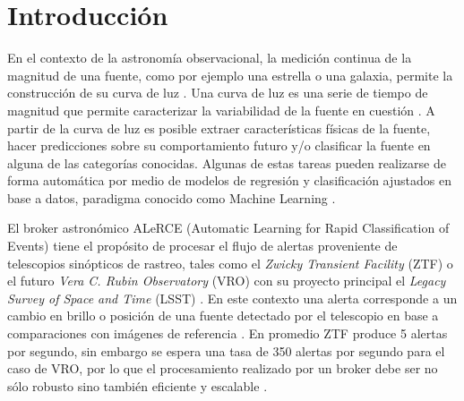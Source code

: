 \newcommand{\Lepp}[1]{\mbox{Lepp}(#1)}
\theoremstyle{definition}
\newtheorem{definition}{Definición}[section]

\newtheorem{theorem}{Teorema}


\newtheorem{lemma}[theorem]{Lema}

\newcommand{\ttt}{\texttt}
\DeclarePairedDelimiter\ceil{\lceil}{\rceil}
\DeclarePairedDelimiter\floor{\lfloor}{\rfloor}
 
\chapter{Introducción}\label{chap:intro}

En el contexto de la astronomía observacional, la medición continua de la magnitud de una fuente, como por ejemplo una estrella o una galaxia, permite la construcción de su curva de luz \cite{warner2006practical}. Una curva de luz es una serie de tiempo de magnitud que permite caracterizar la variabilidad de la fuente en cuestión \cite{percy2007understanding}. A partir de la curva de luz es posible extraer características físicas de la fuente, hacer predicciones sobre su comportamiento futuro y/o clasificar la fuente en alguna de las categorías conocidas. Algunas de estas tareas pueden realizarse de forma automática por medio de modelos de regresión y clasificación ajustados en base a datos, paradigma conocido como Machine Learning \cite{ball2010data, feigelson2012big}. %

El broker astronómico ALeRCE (Automatic Learning for Rapid Classification of Events) \cite{alerce-intro} tiene el propósito de procesar el flujo de alertas proveniente de telescopios sinópticos de rastreo, tales como el {\it Zwicky Transient Facility} (ZTF) \cite{bellm2019zwicky} o el futuro {\it Vera C. Rubin Observatory} (VRO) con su proyecto principal el {\it Legacy Survey of Space and Time} (LSST) \cite{ivezic2019lsst}.  En este contexto una alerta corresponde a un cambio en brillo o posición de una fuente detectado por el telescopio en base a comparaciones con imágenes de referencia \cite{bellm2019plans}. En promedio ZTF produce 5 alertas por segundo, sin embargo se espera una tasa de 350 alertas por segundo para el caso de VRO, por lo que el procesamiento realizado por un broker debe ser no sólo robusto sino también eficiente y escalable  \cite{ivezic2019lsst}.

